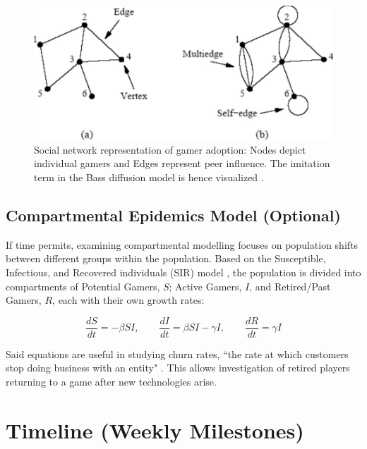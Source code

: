 \documentclass{article}
\begin{document}
\begin{figure} [H]
    \centering
    \includegraphics[width=0.5\linewidth]{Image.jpeg}
    \caption{Social network representation of gamer adoption: Nodes depict individual gamers and Edges represent peer influence. The imitation term in the Bass diffusion model is hence visualized \cite{10.1093/acprof:oso/9780199206650.003.0006}.}
    \label{fig:GraphNodeFigure}
\end{figure}

\subsection{Compartmental Epidemics Model (Optional)}
If time permits, examining compartmental modelling focuses on population shifts between different groups within the population. Based on the Susceptible, Infectious, and Recovered individuals (SIR) model \cite{Hethcote2000Mathematics}, the population is divided into compartments of Potential Gamers, $S$; Active Gamers, $I$, and Retired/Past Gamers, $R$, each with their own growth rates:

\begin{equation}
\frac{dS}{dt} = -\beta S I, 
\qquad \frac{dI}{dt} = \beta S I - \gamma I, 
\qquad \frac{dR}{dt} = \gamma I
\end{equation}

\noindent Said equations are useful in studying churn rates, ``the rate at which customers stop doing business with an entity" \cite{INVESTOPEDIA2025CHURN}. This allows investigation of retired players returning to a game after new technologies arise.

\section{Timeline (Weekly Milestones)}
\end{document}

